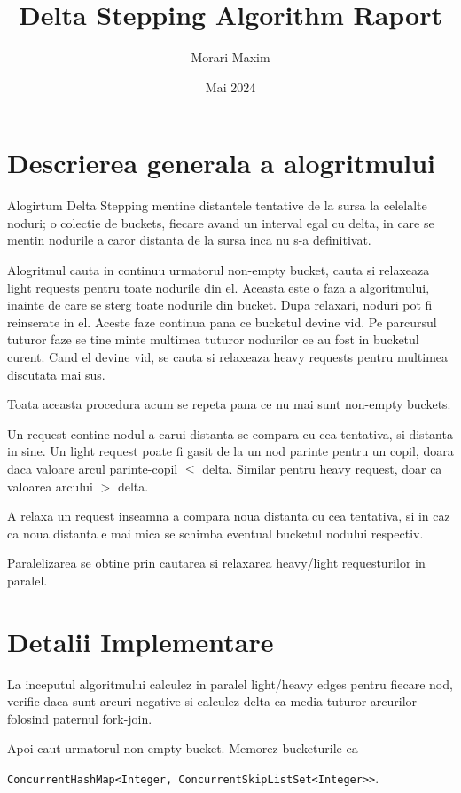 \documentclass{llncs}
\title{Delta Stepping Algorithm Raport}
\author{Morari Maxim}
\date{Mai 2024}
\institute{Facultatea de Informatica, Universitatea Alexandru Ioan Cuza, Iasi, Romania}
\begin{document}
 

\maketitle
 
\section{Descrierea generala a alogritmului}
Alogirtum Delta Stepping mentine distantele tentative de la sursa la celelalte noduri; o colectie de buckets, fiecare avand un interval egal cu delta, in care se mentin nodurile a caror distanta de la sursa inca nu s-a definitivat.

Alogritmul cauta in continuu urmatorul non-empty bucket, cauta si relaxeaza light requests pentru toate nodurile din el. Aceasta este o faza a algoritmului, inainte de care se sterg toate nodurile din bucket. Dupa relaxari, noduri pot fi reinserate in el. Aceste faze continua pana ce bucketul devine vid. Pe parcursul tuturor faze se tine minte multimea tuturor nodurilor ce au fost in bucketul curent. Cand el devine vid, se cauta si relaxeaza heavy requests pentru multimea discutata mai sus. 

Toata aceasta procedura acum se repeta pana ce nu mai sunt non-empty buckets.

Un request contine nodul a carui distanta se compara cu cea tentativa, si distanta in sine. Un light request poate fi gasit de la un nod parinte pentru un copil, doara daca valoare arcul parinte-copil $\leq$ delta. Similar pentru heavy request, doar ca valoarea arcului  \(>\) delta.

A relaxa un request inseamna a compara noua distanta cu cea tentativa, si in caz ca noua distanta e mai mica se schimba eventual bucketul nodului respectiv.

Paralelizarea se obtine prin cautarea si relaxarea heavy/light requesturilor in paralel.
    

\newpage
\section{Detalii Implementare} 
La inceputul algoritmului calculez in paralel light/heavy edges pentru fiecare nod,  verific daca sunt arcuri negative si calculez delta ca media tuturor arcurilor folosind paternul fork-join.

Apoi caut urmatorul non-empty bucket. Memorez bucketurile ca 

\texttt{ConcurrentHashMap<Integer, ConcurrentSkipListSet<Integer>>}.
\end{document}
